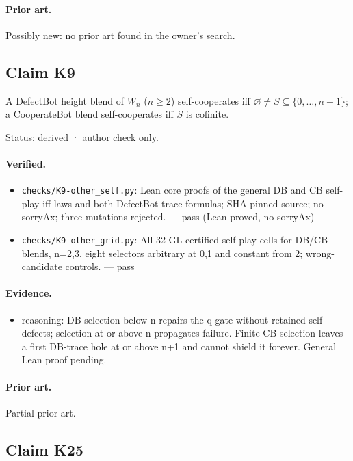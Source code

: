 \documentclass{article}
\begin{document}
\paragraph{Prior art.} Possibly new: no prior art found in the owner's search.

\subsection*{Claim K9}

A DefectBot height blend of $W_n$ ($n\ge2$) self-cooperates iff $\varnothing\ne S\subseteq\{0,\ldots,n-1\}$; a CooperateBot blend self-cooperates iff $S$ is cofinite.

Status: derived · author check only.

\paragraph{Verified.}
\begin{itemize}
\item \texttt{checks/K9-other\_self.py}: Lean core proofs of the general DB and CB self-play iff laws and both DefectBot-trace formulas; SHA-pinned source; no sorryAx; three mutations rejected. --- pass (Lean-proved, no sorryAx)
\item \texttt{checks/K9-other\_grid.py}: All 32 GL-certified self-play cells for DB/CB blends, n=2,3, eight selectors arbitrary at 0,1 and constant from 2; wrong-candidate controls. --- pass
\end{itemize}

\paragraph{Evidence.}
\begin{itemize}
\item reasoning: DB selection below n repairs the q gate without retained self-defects; selection at or above n propagates failure. Finite CB selection leaves a first DB-trace hole at or above n+1 and cannot shield it forever. General Lean proof pending.
\end{itemize}

\paragraph{Prior art.} Partial prior art.

\subsection*{Claim K25}
\end{document}
